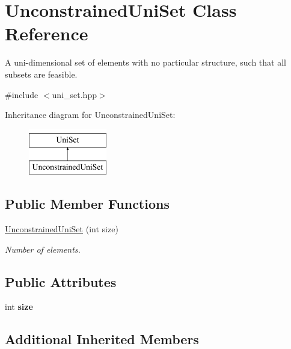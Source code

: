 \hypertarget{classUnconstrainedUniSet}{\section{Unconstrained\-Uni\-Set Class Reference}
\label{classUnconstrainedUniSet}
}


A uni-\/dimensional set of elements with no particular structure, such that all subsets are feasible.  




{\ttfamily \#include $<$uni\-\_\-set.\-hpp$>$}

Inheritance diagram for Unconstrained\-Uni\-Set\-:\begin{figure}[H]
\begin{center}
\leavevmode
\includegraphics[height=2.000000cm]{classUnconstrainedUniSet}
\end{center}
\end{figure}
\subsection*{Public Member Functions}
\begin{DoxyCompactItemize}
\item 
\hyperlink{classUnconstrainedUniSet_a9373537ab707f354176d5abc28870933}{Unconstrained\-Uni\-Set} (int size)
\begin{DoxyCompactList}\small\item\em Number of elements. \end{DoxyCompactList}\end{DoxyCompactItemize}
\subsection*{Public Attributes}
\begin{DoxyCompactItemize}
\item 
\hypertarget{classUnconstrainedUniSet_a919c5b1e24466893a73752ad610c1d7f}{int {\bfseries size}}\label{classUnconstrainedUniSet_a919c5b1e24466893a73752ad610c1d7f}

\end{DoxyCompactItemize}
\subsection*{Additional Inherited Members}



